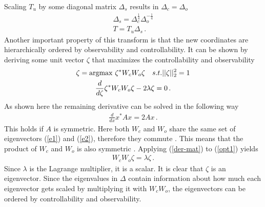 Scaling \(T_u\) by some diagonal matrix \(\Delta_s\) results in \(\Delta_c = \Delta_o\)
\begin{gather}
\Delta_s = \Delta_c^{\frac{1}{4}}\Delta_o^{-\frac{1}{4}} \\
T = T_u \Delta_s  \,.
\end{gather}
Another important property of this transform is that the new coordinates are hierarchically ordered by observability and controllability.
It can be shown by deriving some unit vector \(\zeta\) that maximizes the controllability and observability
\begin{gather}
\zeta = \operatorname*{argmax} \, \zeta^{*}W_cW_o\zeta \quad s.t. ||\zeta||_2^{2} = 1 \\
\frac{d}{d\zeta} \zeta^{*}W_cW_o\zeta - 2\lambda \zeta = 0  \,. \label{opt1}
\end{gather}
As shown here \cite{170373} the remaining derivative can be solved in the following way
\begin{gather}
\frac{d}{dx} x^{*}Ax = 2Ax \,. \label{der-mat}
\end{gather}
This holds if \(A\) is symmetric. 
Here both \(W_c\) and \(W_o\) share the same set of eigenvectors (\ref{e1}) and (\ref{e2}), therefore they commute \cite{170371}.
This means that the product of \(W_c\) and \(W_o\) is also symmetric \cite{170372}.
Applying (\ref{der-mat}) to (\ref{opt1}) yields
\begin{gather}
W_cW_o\zeta = \lambda \zeta \,.
\end{gather}
Since \(\lambda\) is the Lagrange multiplier, it is a scalar. 
It is clear that \(\zeta\) is an eigenvector.
Since the eigenvalues in \(\Delta\) contain information about how much each eigenvector gets scaled by multiplying it with \(W_cW_o\), the eigenvectors can be ordered by controllability and observability.

